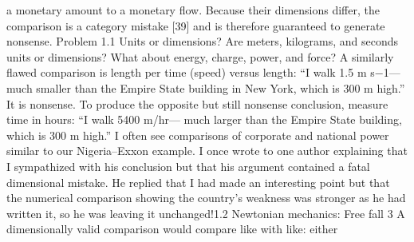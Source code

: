 \documentclass[12pt,a4paper]{article}
\begin{document}
a monetary amount to a monetary flow. Because their dimensions differ,
the comparison is a category mistake [39] and is therefore guaranteed to
generate nonsense.
Problem 1.1 Units or dimensions?
Are meters, kilograms, and seconds units or dimensions? What about energy,
charge, power, and force?
A similarly flawed comparison is length per time (speed) versus length:
“I walk 1.5 m s−1—much smaller than the Empire State building in New
York, which is 300 m high.” It is nonsense. To produce the opposite but
still nonsense conclusion, measure time in hours: “I walk 5400 m/hr—
much larger than the Empire State building, which is 300 m high.”
I often see comparisons of corporate and national power similar to our
Nigeria–Exxon example. I once wrote to one author explaining that I
sympathized with his conclusion but that his argument contained a fatal
dimensional mistake. He replied that I had made an interesting point
but that the numerical comparison showing the country’s weakness was
stronger as he had written it, so he was leaving it unchanged!1.2 Newtonian mechanics: Free fall 3
A dimensionally valid comparison would compare like with like: either
\end{document}
